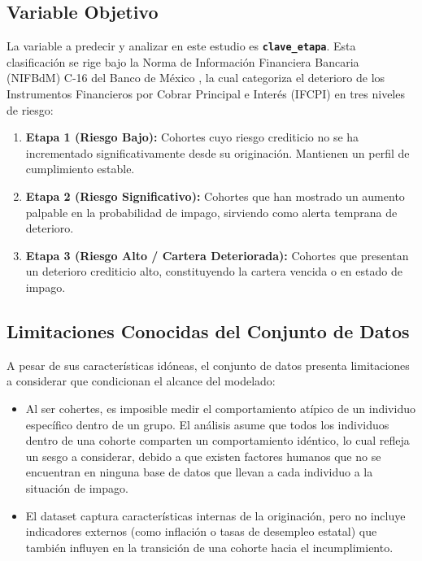 \subsection{Variable Objetivo}
La variable a predecir y analizar en este estudio es \textbf{\texttt{clave\_etapa}}. Esta clasificación se rige bajo la Norma de Información Financiera Bancaria (NIFBdM) C-16 del Banco de México \cite{nifbdm_c16}, la cual categoriza el deterioro de los Instrumentos Financieros por Cobrar Principal e Interés (IFCPI) en tres niveles de riesgo:
\begin{enumerate}
	\item \textbf{Etapa 1 (Riesgo Bajo):} Cohortes cuyo riesgo crediticio no se ha incrementado significativamente desde su originación. Mantienen un perfil de cumplimiento estable.
	\item \textbf{Etapa 2 (Riesgo Significativo):} Cohortes que han mostrado un aumento palpable en la probabilidad de impago, sirviendo como alerta temprana de deterioro.
	\item \textbf{Etapa 3 (Riesgo Alto / Cartera Deteriorada):} Cohortes que presentan un deterioro crediticio alto, constituyendo la cartera vencida o en estado de impago.
\end{enumerate}

\subsection{Limitaciones Conocidas del Conjunto de Datos}
A pesar de sus características idóneas, el conjunto de datos presenta limitaciones a considerar que condicionan el alcance del modelado:
\begin{itemize}
	\item Al ser cohertes, es imposible medir el comportamiento atípico de un individuo específico dentro de un grupo. El análisis asume que todos los individuos dentro de una cohorte comparten un comportamiento idéntico, lo cual refleja un sesgo a considerar, debido a que existen factores humanos que no se encuentran en ninguna base de datos que llevan a cada individuo a la situación de impago.
	\item El dataset captura características internas de la originación, pero no incluye indicadores externos (como inflación o tasas de desempleo estatal) que también influyen en la transición de una cohorte hacia el incumplimiento.
\end{itemize}


